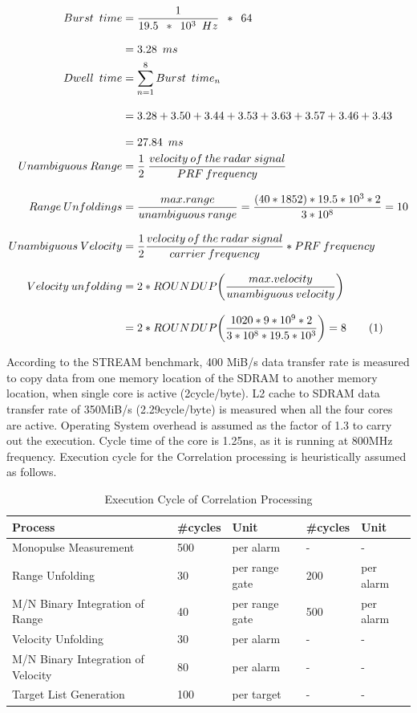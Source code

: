 \begin{align*}
	\label{equ:burst_time_calc}
	Burst \enspace time & = \frac{1}{19.5 \enspace * \enspace 10^{3} \enspace Hz} \enspace * \enspace 64 \\[0.3cm]
	& = 3.28 \enspace ms \\ 
	Dwell \enspace time &= \sum\limits_{n=1}^{8} Burst \enspace time_{n} \\[0.3cm]
	&= 3.28 + 3.50 + 3.44 + 3.53 + 3.63 + 3.57 + 3.46 + 3.43 \\[0.3cm]
	&= 27.84 \enspace ms \\
	Unambiguous \: Range &= \frac{1}{2} \: \frac{velocity \: of \: the \: radar \: signal}{PRF \: frequency} \\[0.3cm]
	Range \: Unfoldings &= \frac{max.range}{unambiguous \: range} = \frac{(40 * 1852) * 19.5 * 10^{3} * 2}{3 * 10^{8}} = 10 \\[0.3cm]
	Unambiguous \: Velocity &= \frac{1}{2} \frac{velocity \: of \: the \: radar \: signal}{carrier \: frequency} * PRF \: frequency \\[0.3cm]
	Velocity \: unfolding &= 2 * ROUNDUP \bigg( \frac{max.velocity}{unambiguous \: velocity} \bigg ) \\[0.3cm]
	&=2 * ROUNDUP \bigg(\frac{1020 * 9 * 10^{9} * 2 }{3 * 10^{8} * 19.5 * 10^{3}}\bigg) = 8 \stepcounter{equation}\tag{\theequation} 
\end{align*}

According to the STREAM benchmark, 400 MiB/s data transfer rate is measured to copy data from one memory location of the SDRAM to another memory location, when single core is active (2cycle/byte). L2 cache to SDRAM data transfer rate of 350MiB/s (2.29cycle/byte) is measured when all the four cores are active. Operating System overhead is assumed as the factor of 1.3 to carry out the execution. Cycle time of the core is 1.25ns, as it is running at 800MHz frequency. Execution cycle for the Correlation processing is heuristically assumed as follows.


\begin{table}[h!]
	\centering
	\begin{tabular}{|l|l|l||l|l|} 
	 	\hline
		\textbf{Process} & \textbf{\#cycles} & \textbf{Unit} & \textbf{\#cycles} & \textbf{Unit}  \\ \hline
		Monopulse Measurement & 500 & per alarm & - & - \\ \hline
		Range Unfolding & 30 & per range gate & 200 & per alarm \\ \hline
		M/N Binary Integration of Range & 40 & per range gate & 500 & per alarm \\ \hline
		Velocity Unfolding & 30 & per alarm & - & - \\ \hline
		M/N Binary Integration of Velocity & 80 & per alarm & - & - \\ \hline
		Target List Generation & 100 & per target & - & - \\ \hline
	\end{tabular}
	\caption{Execution Cycle of Correlation Processing \cite{fcas}}
\end{table}


